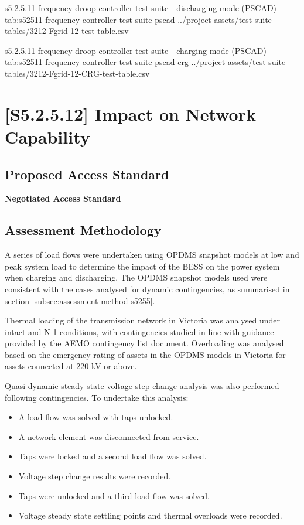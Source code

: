 \documentclass{../grid-link-report}
\newcommand{\projectassetsdir}{../project-assets}
\begin{document}
	{
		\fontsize{11}{13}\selectfont
		\autoscaledlongtable
		{s5.2.5.11 frequency droop controller test suite - discharging mode (PSCAD)}
		{tab:s52511-frequency-controller-test-suite-pscad}
		{\projectassetsdir/test-suite-tables/3212-Fgrid-12-test-table.csv}
	}
	
		{
		\fontsize{11}{13}\selectfont
		\autoscaledlongtable
		{s5.2.5.11 frequency droop controller test suite - charging mode (PSCAD)}
		{tab:s52511-frequency-controller-test-suite-pscad-crg}
		{\projectassetsdir/test-suite-tables/3212-Fgrid-12-CRG-test-table.csv}
	}

	\section{[S5.2.5.12] Impact on Network Capability}
	\subsection{Proposed Access Standard}
	\textbf{Negotiated Access Standard}
		\begin{tcolorbox}[lightgreenbox]
			
		\end{tcolorbox}
	\subsection{Assessment Methodology}
	A series of load flows were undertaken using OPDMS snapshot models at low and peak system load to determine the impact of the BESS on the power system when charging and discharging. The OPDMS snapshot models used were consistent with the cases analysed for dynamic contingencies, as summarised in section \ref{subsec:assessment-method-s5255}.
	
	Thermal loading of the transmission network in Victoria was analysed under intact and N-1 conditions, with contingencies studied in line with guidance provided by the AEMO contingency list document. \cite{wan-contingency-list} Overloading was analysed based on the emergency rating of assets in the OPDMS models in Victoria for assets connected at 220 kV or above.
	
	Quasi-dynamic steady state voltage step change analysis was also performed following contingencies. To undertake this analysis:
	
	\begin{itemize}
		\item A load flow was solved with taps unlocked.
		\item A network element was disconnected from service.
		\item Taps were locked and a second load flow was solved.
		\item Voltage step change results were recorded.
		\item Taps were unlocked and a third load flow was solved.
		\item Voltage steady state settling points and thermal overloads were recorded.
	\end{itemize}
	
\end{document}
